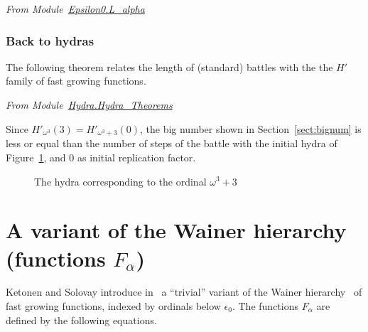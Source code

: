 \emph{From Module~\href{../theories/html/hydras.Epsilon0.L_alpha.html\#H'_L_}{Epsilon0.L\_alpha}}


 
\subsubsection{Back to hydras}

The following theorem relates the length of (standard) battles with the the $H'$ family of fast growing functions.

\vspace{4pt}

\noindent
\emph{From Module~\href{../theories/html/hydras.Hydra.Hydra_Theorems.html}{Hydra.Hydra\_Theorems}}




Since $H'_{\omega^3}(3)= H'_{\omega^3+3}(0)$, the big number shown in Section~\vref{sect:bignum} is less or equal than 
the number of steps of the battle with the initial hydra of
Figure~\ref{fig:start}, and  $0$ as initial replication factor.

\begin{figure}[h]
  \centering

  \caption{The hydra corresponding to the ordinal $\omega^3+3$}
  \label{fig:start}
\end{figure}




\section{A variant of the Wainer hierarchy (functions \texorpdfstring{$F_\alpha$}{F\_alpha})}
\label{sect:wainer}


Ketonen and Solovay introduce in~\cite{KS81} a ``trivial'' variant of the Wainer hierarchy~\cite{BW85, Wainer1970} of fast growing functions, indexed by ordinals below $\epsilon_0$.
The functions $F_\alpha$ are defined by the following equations.

